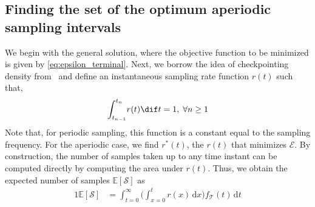 
\subsection{Finding the set of the optimum aperiodic sampling intervals}

We begin with the general solution, where the objective function to be minimized is given by \cref{eq:epsilon_terminal}.
Next, we borrow the idea of checkpointing density from~\cite{satoshi1992optimal} and define an instantaneous sampling rate function $r(t)$ such that,
\begin{alignat}{1}
{\int_{t_{n-1}}^{t_n}}r(t)\dif t=1,\;\forall n\geq1\label{eq:rt}
\end{alignat}
Note that, for periodic sampling, this function is a constant equal to the sampling frequency.
For the aperiodic case, we find $r^*(t)$, the $r(t)$ that minimizes $\mathcal{E}$.
By construction, the number of samples taken up to any time instant can be computed directly by computing the area under $r(t)$.
Thus, we obtain the expected number of samples $\mathbb{E}[\mathcal{S}]$ as
\begin{alignat}{1}
\mathbb{E}[\mathcal{S}]&=\int_{t=0}^{\infty}\bigg(\!\int_{x=0}^{t}\!\!\!\!r(x)\,\mathrm{d}x\bigg)f_{\mathcal{T}}(t)\,\mathrm{d}t\label{eq:Es}
\end{alignat}

